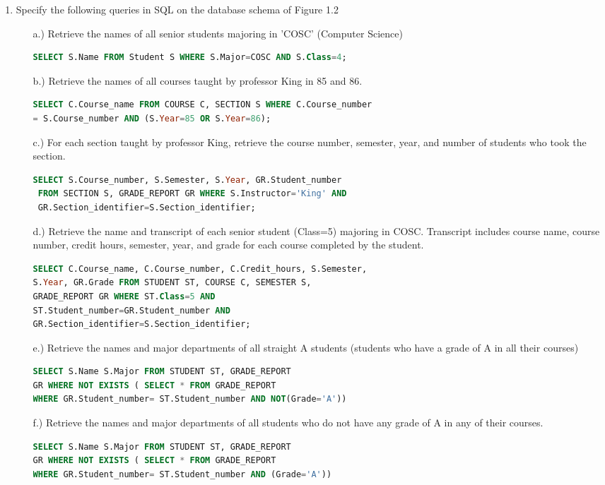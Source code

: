 \documentclass[12pt]{article}
\begin{document}
\begin{enumerate}
	\item Specify the following queries in SQL on the database schema of Figure 1.2
	\begin{enumerate}
		\item[a.)] Retrieve the names of all senior students majoring in 'COSC' (Computer Science)
		\begin{lstlisting}[language=sql]
SELECT S.Name FROM Student S WHERE S.Major=COSC AND S.Class=4; 
		\end{lstlisting}
		\item[b.)] Retrieve the names of all courses taught by professor King in 85 and 86.
		\begin{lstlisting}[language=sql]
SELECT C.Course_name FROM COURSE C, SECTION S WHERE C.Course_number 
= S.Course_number AND (S.Year=85 OR S.Year=86);
		\end{lstlisting}
		\item[c.)] For each section taught by professor King, retrieve the course number, semester, year, and number of students who took the section.
		\begin{lstlisting}[language=sql]
SELECT S.Course_number, S.Semester, S.Year, GR.Student_number 
 FROM SECTION S, GRADE_REPORT GR WHERE S.Instructor='King' AND
 GR.Section_identifier=S.Section_identifier;
		\end{lstlisting}
		\item[d.)] Retrieve the name and transcript of each senior student (Class=5) majoring in COSC. Transcript includes course name, course number, credit hours, semester, year, and grade for each course completed by the student.
		\begin{lstlisting}[language=sql]
SELECT C.Course_name, C.Course_number, C.Credit_hours, S.Semester, 
S.Year, GR.Grade FROM STUDENT ST, COURSE C, SEMESTER S, 
GRADE_REPORT GR WHERE ST.Class=5 AND 
ST.Student_number=GR.Student_number AND 
GR.Section_identifier=S.Section_identifier;
		\end{lstlisting}
		\item[e.)] Retrieve the names and major departments of all straight A students (students who have a grade of A in all their courses)
		\begin{lstlisting}[language=sql]
SELECT S.Name S.Major FROM STUDENT ST, GRADE_REPORT 
GR WHERE NOT EXISTS ( SELECT * FROM GRADE_REPORT
WHERE GR.Student_number= ST.Student_number AND NOT(Grade='A'))
		\end{lstlisting}
		\item[f.)] Retrieve the names and major departments of all students who do not have any grade of A in any of their courses.		
		\begin{lstlisting}[language=sql]
SELECT S.Name S.Major FROM STUDENT ST, GRADE_REPORT 
GR WHERE NOT EXISTS ( SELECT * FROM GRADE_REPORT
WHERE GR.Student_number= ST.Student_number AND (Grade='A'))
		\end{lstlisting}		
	\end{enumerate}		
	

\end{enumerate}
\end{document}

